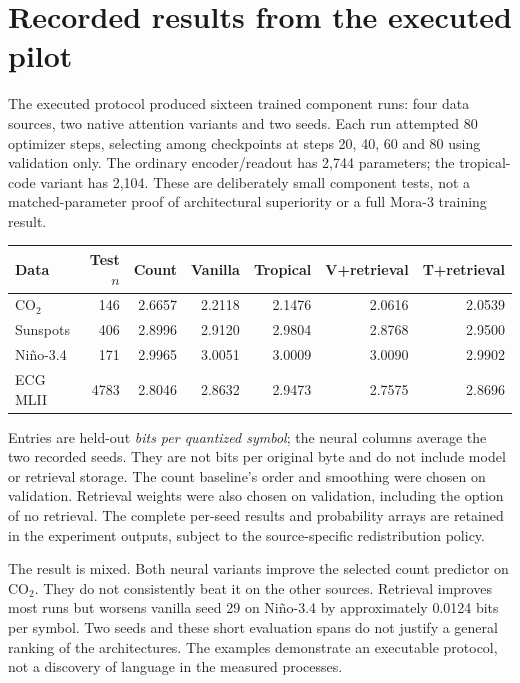 \section{Recorded results from the executed pilot}
\label{sec:wb-recorded-results}

The executed protocol produced sixteen trained component runs: four data sources, two native attention variants and two seeds. Each run attempted 80 optimizer steps, selecting among checkpoints at steps 20, 40, 60 and 80 using validation only. The ordinary encoder/readout has 2,744 parameters; the tropical-code variant has 2,104. These are deliberately small component tests, not a matched-parameter proof of architectural superiority or a full Mora-3 training result.

\begin{center}\small
\begin{tabular}{lrrrrrr}
\toprule
Data & Test $n$ & Count & Vanilla & Tropical & V+retrieval & T+retrieval\\
\midrule
CO$_2$ &146&2.6657&2.2118&2.1476&2.0616&2.0539\\
Sunspots &406&2.8996&2.9120&2.9804&2.8768&2.9500\\
Ni\~no-3.4 &171&2.9965&3.0051&3.0009&3.0090&2.9902\\
ECG MLII &4783&2.8046&2.8632&2.9473&2.7575&2.8696\\
\bottomrule
\end{tabular}
\end{center}

Entries are held-out \emph{bits per quantized symbol}; the neural columns average the two recorded seeds. They are not bits per original byte and do not include model or retrieval storage. The count baseline's order and smoothing were chosen on validation. Retrieval weights were also chosen on validation, including the option of no retrieval. The complete per-seed results and probability arrays are retained in the experiment outputs, subject to the source-specific redistribution policy.

The result is mixed. Both neural variants improve the selected count predictor on CO$_2$. They do not consistently beat it on the other sources. Retrieval improves most runs but worsens vanilla seed 29 on Ni\~no-3.4 by approximately 0.0124 bits per symbol. Two seeds and these short evaluation spans do not justify a general ranking of the architectures. The examples demonstrate an executable protocol, not a discovery of language in the measured processes.

